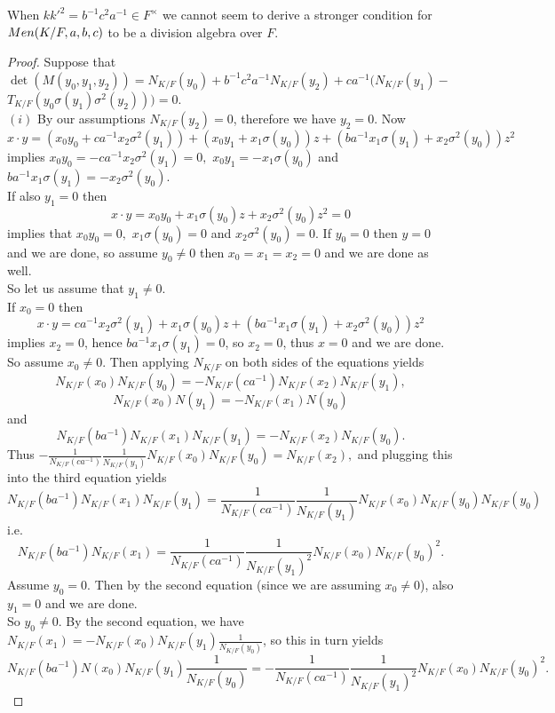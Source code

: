 \documentclass[11pt]{amsart}
\theoremstyle{plain}
\theoremstyle{definition}
\begin{document}
  When $kk'^2=b^{-1}c^2 a^{-1}\in F^\times$ we cannot seem to derive a stronger condition for ${\rm Men}(K/F, a,b,c)$ to be a division algebra over $F$.

\begin{proof}
Suppose that $\det (M(y_0, y_1, y_2))
 =N_{K/F}(y_0) + b^{-1}c^2 a^{-1}N_{K/F}(y_2)+ ca^{-1}(N_{K/F}(y_1)-
 $\\
 $T_{K/F}(y_0\sigma(y_1)\sigma^2(y_2)))=0.$
 \\
$(i)$  By our assumptions  $N_{K/F}(y_2)=0$,
  therefore we have $y_2=0 $. Now
 $$x\cdot y = (x_0y_0  + ca^{-1}x_2 \sigma^2(y_1))+ (x_0y_1 + x_1 \sigma(y_0) )z
+ ( ba^{-1}x_1 \sigma(y_1) + x_2 \sigma^2(y_0))z^2$$
implies $x_0y_0  =- ca^{-1}x_2 \sigma^2(y_1)=0,$ $x_0y_1 =- x_1 \sigma(y_0)$ and $ba^{-1}x_1 \sigma(y_1) =- x_2 \sigma^2(y_0)$.
\\
If also $y_1=0$ then
$$x\cdot y = x_0y_0 + x_1 \sigma(y_0)z  +  x_2 \sigma^2(y_0)z^2=0$$
implies that $x_0y_0=0,$ $ x_1 \sigma(y_0)=0$ and $ x_2 \sigma^2(y_0)=0$. If $y_0=0$ then $y=0$ and we are done, so assume $y_0\not=0$ then $x_0=x_1=x_2=0$ and we are done as well.\\
So let us assume that $y_1\not=0$.\\
If $x_0=0$ then
$$
x\cdot y =  ca^{-1}x_2 \sigma^2(y_1)
+  x_1 \sigma(y_0) z
+ ( ba^{-1}x_1 \sigma(y_1) + x_2 \sigma^2(y_0))z^2
$$
implies $x_2=0$, hence $ ba^{-1}x_1 \sigma(y_1)=0$, so $x_2=0$, thus $x=0$ and we are done.
\\
So assume $x_0\not=0$. Then applying $N_{K/F}$ on both sides of the equations yields
 $$N_{K/F}(x_0)N_{K/F}(y_0 ) =- N_{K/F}(ca^{-1})N_{K/F}(x_2 )N_{K/F}(y_1),$$
  $$N_{K/F}(x_0)N(y_1 )=- N_{K/F}(x_1)N(y_0)$$
   and
   $$N_{K/F}(ba^{-1})N_{K/F}(x_1 )N_{K/F}(y_1) =- N_{K/F}(x_2 )N_{K/F}(y_0).$$
Thus
$- \frac{1}{N_{K/F}(ca^{-1})}\frac{1}{N_{K/F}(y_1)}N_{K/F}(x_0)N_{K/F}(y_0 ) =N_{K/F}(x_2 ),$ and plugging this into the third equation yields
$$N_{K/F}(ba^{-1})N_{K/F}(x_1 )N_{K/F}(y_1) =  \frac{1}{N_{K/F}(ca^{-1})}\frac{1}{N_{K/F}(y_1)}N_{K/F}(x_0)N_{K/F}(y_0 ) N_{K/F}(y_0)$$
i.e.
$$N_{K/F}(ba^{-1})N_{K/F}(x_1 ) =  \frac{1}{N_{K/F}(ca^{-1})}\frac{1}{N_{K/F}(y_1)^2}N_{K/F}(x_0) N_{K/F}(y_0)^2.$$
Assume $y_0=0$. Then by the second equation (since we are assuming $x_0\not=0$), also $y_1=0$ and we are done.
\\ So $y_0\not=0$. By the second equation, we have $N_{K/F}(x_1)= -N_{K/F}(x_0)N_{K/F}(y_1)\frac{1}{N_{K/F}(y_0)}$, so this in turn yields
$$N_{K/F}(ba^{-1})N(x_0)N_{K/F}(y_1)\frac{1}{N_{K/F}(y_0)} =- \frac{1}{N_{K/F}(ca^{-1})}\frac{1}{N_{K/F}(y_1)^2}N_{K/F}(x_0) N_{K/F}(y_0)^2.$$

\end{proof}
\end{document}
